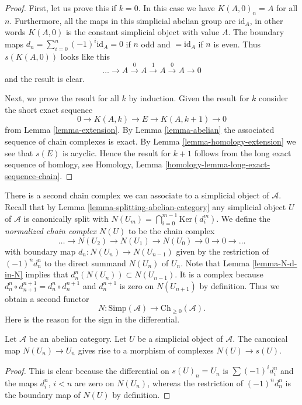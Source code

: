 \begin{proof}
First, let us prove this if $k = 0$.
In this case we have $K(A, 0)_n = A$ for all $n$.
Furthermore, all the maps in this simplicial abelian
group are $\text{id}_A$, in other words $K(A, 0)$
is the constant simplicial object with value $A$.
The boundary maps $d_n = \sum_{i = 0}^n (-1)^i \text{id}_A
= 0$ if $n$ odd and $ = \text{id}_A$ if $n$ is even.
Thus $s(K(A, 0))$ looks like this
$$
\ldots \to A \xrightarrow{0} A \xrightarrow{1} A \xrightarrow{0} A \to 0
$$
and the result is clear.

\medskip\noindent
Next, we prove the result for all $k$ by induction.
Given the result for $k$ consider the short exact sequence
$$
0 \to K(A, k) \to E \to K(A, k + 1) \to 0
$$
from Lemma \ref{lemma-extension}.
By Lemma \ref{lemma-abelian} the associated sequence of
chain complexes is exact.
By Lemma \ref{lemma-homology-extension} we see that
$s(E)$ is acyclic. Hence the result for $k + 1$
follows from the long exact sequence of homlogy,
see Homology, Lemma \ref{homology-lemma-long-exact-sequence-chain}.
\end{proof}

\noindent
There is a second chain complex we can associate to
a simplicial object of $\mathcal{A}$. Recall that by
Lemma \ref{lemma-splitting-abelian-category}
any simplicial object $U$ of $\mathcal{A}$
is canonically split with
$N(U_m) = \bigcap_{i = 0}^{m - 1} \text{Ker}(d^m_i)$.
We define the {\it normalized chain complex $N(U)$}
to be the chain complex
$$
\ldots \to N(U_2) \to N(U_1) \to N(U_0) \to 0 \to 0 \to \ldots
$$
with boundary map $d_n : N(U_n) \to N(U_{n - 1})$ given
by the restriction of $(-1)^nd^n_n$ to the direct summand
$N(U_n)$ of $U_n$. Note that Lemma \ref{lemma-N-d-in-N}
implies that $d^n_n(N(U_n)) \subset N(U_{n - 1})$.
It is a complex because
$d^n_n \circ d^{n + 1}_{n + 1} = d^n_n \circ d^{n + 1}_n$
and $d^{n + 1}_n$ is zero on $N(U_{n + 1})$ by definition.
Thus we obtain a second functor
$$
N : \text{Simp}(\mathcal{A}) \longrightarrow \text{Ch}_{\geq 0}(\mathcal{A}).
$$
Here is the reason for the sign in the differential.

\begin{lemma}
\label{lemma-map-associated-complexes}
Let $\mathcal{A}$ be an abelian category.
Let $U$ be a simplicial object of $\mathcal{A}$.
The canonical map $N(U_n) \to U_n$ gives rise to
a morphism of complexes $N(U) \to s(U)$.
\end{lemma}

\begin{proof}
This is clear because the differential
on $s(U)_n = U_n$ is $\sum (-1)^i d^n_i$ and
the maps $d^n_i$, $i < n$ are zero on $N(U_n)$,
whereas the restriction of $(-1)^nd^n_n$ is the boundary
map of $N(U)$ by definition.
\end{proof}

